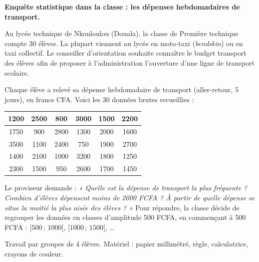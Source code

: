 \documentclass[11pt]{article}
\newcounter{popsec}
\newcounter{popsub}
\newcommand{\courssub}[1]{%
  \stepcounter{popsub}%
  \par\vspace{9pt}\noindent{\popxbold\fontsize{11.5}{13}\selectfont\color{popink}{\color{poporange}\thepopsec.\thepopsub}\hspace{6pt}#1}\par\nopagebreak\vspace{4pt}
}
\begin{document}
\textbf{Enquête statistique dans la classe : les dépenses hebdomadaires de transport.}

Au lycée technique de Nkouloulou (Douala), la classe de Première technique compte 30 élèves. La plupart viennent au lycée en moto-taxi (\emph{bendskin}) ou en taxi collectif. Le conseiller d'orientation souhaite connaître le budget transport des élèves afin de proposer à l'administration l'ouverture d'une ligne de transport scolaire.

Chaque élève a relevé sa dépense hebdomadaire de transport (aller-retour, 5 jours), en francs CFA. Voici les 30 données brutes recueillies :

\begin{center}
\begin{tabular}{|c|c|c|c|c|c|}
\hline
\rowcolor{popblueL}
1200 & 2500 & 800 & 3000 & 1500 & 2200 \\
\hline
1750 & 900 & 2800 & 1300 & 2000 & 1600 \\
\hline
3500 & 1100 & 2400 & 750 & 1900 & 2700 \\
\hline
1400 & 2100 & 1000 & 3200 & 1800 & 1250 \\
\hline
2300 & 1500 & 950 & 2600 & 1700 & 1450 \\
\hline
\end{tabular}
\end{center}

Le proviseur demande : \emph{« Quelle est la dépense de transport la plus fréquente ? Combien d'élèves dépensent moins de 2000 FCFA ? À partir de quelle dépense se situe la moitié la plus aisée des élèves ? »} Pour répondre, la classe décide de regrouper les données en classes d'amplitude 500 FCFA, en commençant à 500 FCFA : $[500\,;\,1000[$, $[1000\,;\,1500[$, \dots

\courssub{Consignes}

Travail par groupes de 4 élèves. Matériel : papier millimétré, règle, calculatrice, crayons de couleur.
\end{document}
